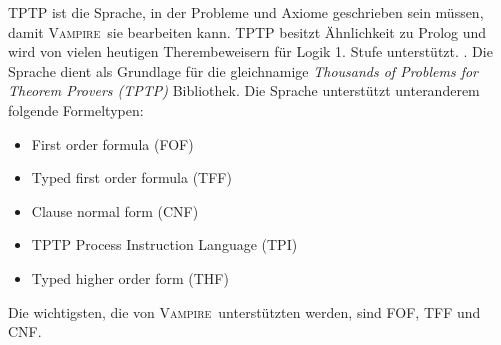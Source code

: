 \documentclass{article}
\newcommand{\vampire}{\textsc{Vampire}~}
\begin{document}
TPTP ist die Sprache, in der Probleme und Axiome geschrieben sein müssen, damit \vampire sie bearbeiten kann. TPTP besitzt Ähnlichkeit zu Prolog und wird von vielen heutigen Therembeweisern für Logik 1. Stufe unterstützt. \cite[S. 4]{cav2013}. Die Sprache dient als Grundlage für die gleichnamige \textit{Thousands of Problems for Theorem Provers (TPTP)} Bibliothek. Die Sprache unterstützt unteranderem folgende Formeltypen:
\begin{itemize}
	\item First order formula (FOF)
	\item Typed first order formula (TFF)
	\item Clause normal form (CNF)
	\item TPTP Process Instruction Language  (TPI)
	\item Typed higher order form (THF)
\end{itemize}
Die wichtigsten, die von \vampire unterstützten werden, sind FOF, TFF und CNF.
\end{document}
